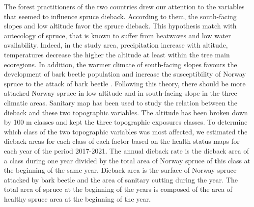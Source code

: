 \documentclass[3p,procedia]{elsarticle}
\begin{document}

The forest practitioners of the two countries drew our attention to the variables that seemed to influence spruce dieback.
According to them, the south-facing slopes and low altitude favor the spruce dieback.
This hypothesis match with autecology of spruce, that is known to suffer from heatwaves and low water availability.
Indeed, in the study area, precipitation increase with altitude, temperatures decrease the higher the altitude at least within the tree main ecoregions.
In addition, the warmer climate of south-facing slopes favours the development of bark beetle population \citep{annila_influence_1969, baier_phenipscomprehensive_2007, jonsson_2009, marini_climate_2012} and increase the susceptibility of Norway spruce to the attack of bark beetle \citep{wermelinger_ecology_2004, netherer_waterlimiting_2015}.
Following this theory, there should be more attacked Norway spruce in low altitude and in south-facing slope in the three climatic areas.  
Sanitary map has been used to study the relation between the dieback and these two topographic variables.
The altitude has been broken down  by 100 m classes and kept the three topographic exposures classes.
To determine which class of the two topographic variables was most affected, we estimated the dieback areas for each class of each factor based on the health status maps for each year of the period 2017-2021.
The  annual dieback rate is  the dieback area of a class during one year divided by the total area of Norway spruce of this class at the beginning of the same year. 
Dieback area is the surface of Norway spruce attacked by bark beetle and the area of sanitary cutting during the year. 
The total area of spruce at the beginning of the years is composed of the area of healthy spruce area at the beginning of the year. 


\end{document}
